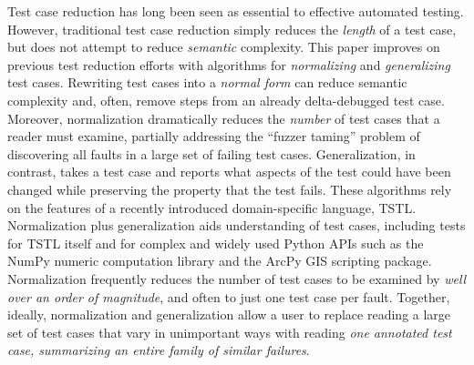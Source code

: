 Test case reduction has long been seen as essential to effective automated testing.  However, traditional test case reduction simply reduces the \emph{length} of a test case, but does not attempt to reduce \emph{semantic} complexity.  This paper improves on previous test reduction efforts with algorithms for \emph{normalizing} and \emph{generalizing} test cases.  Rewriting test cases into a \emph{normal form} can reduce semantic complexity and, often, remove steps from an already delta-debugged test case.  Moreover, normalization dramatically reduces the \emph{number} of test cases that a reader must examine, partially addressing the ``fuzzer taming'' problem of discovering all faults in a large set of failing test cases.  Generalization, in contrast, takes a test case and reports what aspects of the test could have been changed while preserving the property that the test fails.  These algorithms rely on the features of a recently introduced domain-specific language, TSTL.  Normalization plus generalization aids understanding of test cases, including tests for TSTL itself and for complex and widely used Python APIs such as the NumPy numeric computation library and the ArcPy GIS scripting package.  Normalization frequently reduces the number of test cases to be examined by \emph{well over an order of magnitude}, and often to just one test case per fault.  Together, ideally, normalization and generalization allow a user to replace reading a large set of test cases that vary in unimportant ways with reading \emph{one annotated test case, summarizing an entire family of similar failures}.